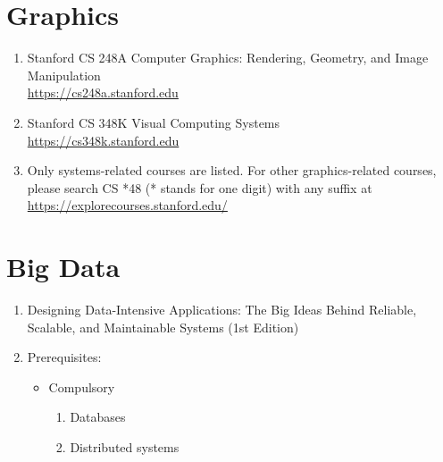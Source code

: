 \documentclass{article}
\begin{document}
\section{Graphics}
\begin{enumerate}
    \item Stanford CS 248A
    Computer Graphics:
Rendering, Geometry, and Image Manipulation\\
\href{https://cs248a.stanford.edu}{https://cs248a.stanford.edu}
    \item Stanford CS 348K
    Visual Computing Systems\\
    \href{https://cs348k.stanford.edu}{https://cs348k.stanford.edu}
    \item Only systems-related courses are listed.
    For other graphics-related courses, please search CS *48 (* stands for one digit) with any suffix at \\
    \href{https://explorecourses.stanford.edu/}{https://explorecourses.stanford.edu/}
\end{enumerate}

\section{Big Data}
\begin{enumerate}
    \item Designing Data-Intensive Applications: The Big Ideas Behind Reliable, Scalable, and Maintainable Systems (1st Edition) \cite{kleppmann2017designing}
    \item Prerequisites:
    \begin{itemize}
        \item Compulsory
        \begin{enumerate}
            \item Databases
            \item Distributed systems
        \end{enumerate}
    \end{itemize}
\end{enumerate}
\end{document}
